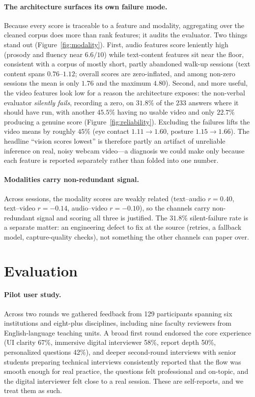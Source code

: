 \documentclass[11pt]{article}
\begin{document}
\paragraph{The architecture surfaces its own failure mode.} Because every score is traceable to a feature and modality, aggregating over the cleaned corpus does more than rank features; it audits the evaluator. Two things stand out (Figure~\ref{fig:modality}). First, audio features score leniently high (prosody and fluency near $6.6/10$) while text-content features sit near the floor, consistent with a corpus of mostly short, partly abandoned walk-up sessions (text content spans $0.76$--$1.12$; overall scores are zero-inflated, and among non-zero sessions the mean is only $1.76$ and the maximum $4.80$). Second, and more useful, the video features look low for a reason the architecture exposes: the non-verbal evaluator \emph{silently fails}, recording a zero, on $31.8\%$ of the $233$ answers where it should have run, with another $45.5\%$ having no usable video and only $22.7\%$ producing a genuine score (Figure~\ref{fig:reliability}). Excluding the failures lifts the video means by roughly $45\%$ (eye contact $1.11\!\rightarrow\!1.60$, posture $1.15\!\rightarrow\!1.66$). The headline ``vision scores lowest'' is therefore partly an artifact of unreliable inference on real, noisy webcam video---a diagnosis we could make only because each feature is reported separately rather than folded into one number.

\paragraph{Modalities carry non-redundant signal.} Across sessions, the modality scores are weakly related (text--audio $r{=}0.40$, text--video $r{=}-0.14$, audio--video $r{=}-0.10$), so the channels carry non-redundant signal and scoring all three is justified. The $31.8\%$ silent-failure rate is a separate matter: an engineering defect to fix at the source (retries, a fallback model, capture-quality checks), not something the other channels can paper over.

\section{Evaluation}
\label{sec:eval}
\paragraph{Pilot user study.} Across two rounds we gathered feedback from 129 participants spanning six institutions and eight-plus disciplines, including nine faculty reviewers from English-language teaching units. A broad first round endorsed the core experience (UI clarity 67\%, immersive digital interviewer 58\%, report depth 50\%, personalized questions 42\%), and deeper second-round interviews with senior students preparing technical interviews consistently reported that the flow was smooth enough for real practice, the questions felt professional and on-topic, and the digital interviewer felt close to a real session. These are self-reports, and we treat them as such.
\end{document}
